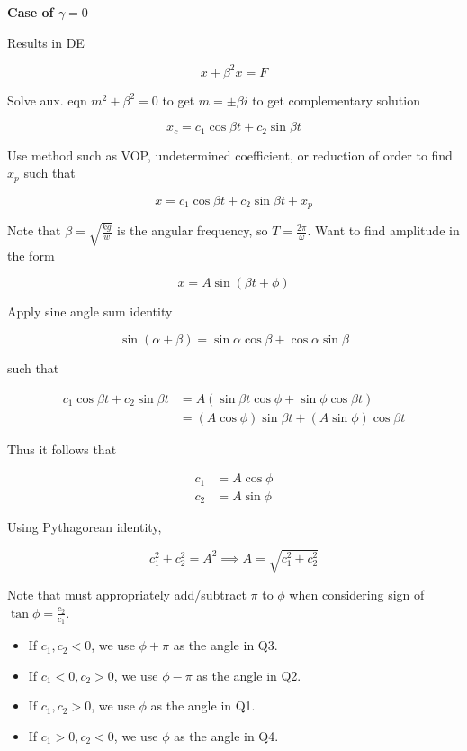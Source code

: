 \textbf{Case of $\gamma = 0$}

Results in DE

\begin{equation*}
    \ddot x +\beta^2 x= F
\end{equation*}

Solve aux. eqn $m^2+\beta^2=0$ to get $m =\pm \beta i$ to get complementary solution

\begin{equation*}
    x_c=c_1\cos\beta t + c_2\sin\beta t
\end{equation*}

Use method such as VOP, undetermined coefficient, or reduction of order to find $x_p$ such that

\begin{equation*}
    x = c_1\cos\beta t + c_2\sin\beta t + x_p
\end{equation*}

Note that $\beta = \sqrt{\frac{kg}{w}}$ is the angular frequency, so $T=\frac{2\pi}{\omega}$.
Want to find amplitude in the form

\begin{equation*}
    x=A\sin (\beta t+\phi)
\end{equation*}

Apply sine angle sum identity

\begin{equation*}
    \sin(\alpha + \beta)=\sin\alpha \cos\beta + \cos\alpha \sin\beta
\end{equation*}

such that

\begin{align*}
    c_1\cos\beta t + c_2\sin\beta t&=A(\sin\beta t\cos\phi +\sin\phi \cos\beta t)\\
    &=(A\cos\phi)\sin\beta t+(A\sin\phi)\cos\beta t
\end{align*}

Thus it follows that

\begin{align*}
    c_1&=A\cos\phi\\
    c_2&=A\sin\phi
\end{align*}

Using Pythagorean identity,

\begin{equation*}
    c_1^2+c_2^2=A^2\implies A=\sqrt{c_1^2+c_2^2}
\end{equation*}

Note that must appropriately add/subtract $\pi$ to $\phi$ when considering sign of $\tan\phi=\frac{c_2}{c_1}$.
\begin{itemize}
    \item If $c_1,c_2<0$, we use $\phi+\pi$ as the angle in Q3.
    \item If $c_1<0,c_2>0$, we use $\phi-\pi$ as the angle in Q2.
    \item If $c_1,c_2>0$, we use $\phi$ as the angle in Q1.
    \item If $c_1>0, c_2<0$, we use $\phi$ as the angle in Q4.
\end{itemize}

